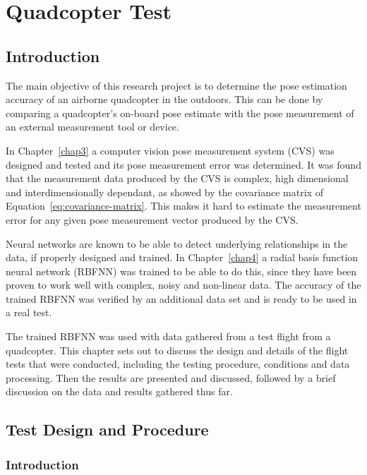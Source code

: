 \chapter{Quadcopter Test}
\label{chap5}

\section{Introduction}

The main objective of this research project is to determine the pose estimation accuracy of an airborne quadcopter in the outdoors. This can be done by comparing a quadcopter's on-board pose estimate with the pose measurement of an external measurement tool or device.  

In Chapter~\ref{chap3} a computer vision pose measurement system (CVS) was designed and tested and its pose measurement error was determined. It was found that the measurement data produced by the CVS is complex, high dimensional and interdimensionally dependant, as showed by the covariance matrix of Equation~\ref{eq:covariance-matrix}. This makes it hard to estimate the measurement error for any given pose measurement vector produced by the CVS.\@ 

Neural networks are known to be able to detect underlying relationships in the data, if properly designed and trained. In Chapter~\ref{chap4} a radial basis function neural network (RBFNN) was trained to be able to do this, since they have been proven to work well with complex, noisy and non-linear data. The accuracy of the trained RBFNN was verified by an additional data set and is ready to be used in a real test. 

The trained RBFNN was used with data gathered from a test flight from a quadcopter. This chapter sets out to discuss the design and details of the flight tests that were conducted, including the testing procedure, conditions and data processing. Then the results are presented and discussed, followed by a brief discussion on the data and results gathered thus far. 

\section{Test Design and Procedure}

\subsection{Introduction}

